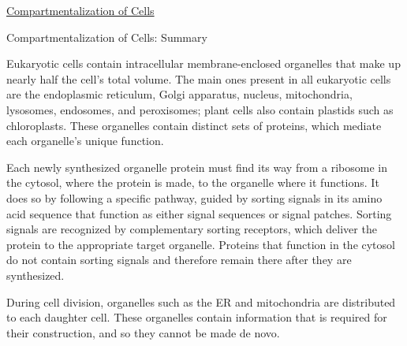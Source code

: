 \documentclass[12pt,letterpaper]{article}
\begin{document}
\begin{secbox}{\hyperlink{12}{Compartmentalization of Cells}}
{    \begin{probbox}{Compartmentalization of Cells: Summary}\end{probbox}
        Eukaryotic cells contain intracellular membrane-enclosed organelles that make up nearly half the cell’s total volume. The main ones present in all eukaryotic cells are the endoplasmic reticulum, Golgi apparatus, nucleus, mitochondria, lysosomes, endosomes, and peroxisomes; plant cells also contain plastids such as chloroplasts. These organelles contain distinct sets of proteins, which mediate each organelle’s unique function.\par 
        \vspace{10 pt}
        Each newly synthesized organelle protein must find its way from a ribosome in the cytosol, where the protein is made, to the organelle where it functions. It does so by following a specific pathway, guided by sorting signals in its amino acid sequence that function as either signal sequences or signal patches. Sorting signals are recognized by complementary sorting receptors, which deliver the protein to the appropriate target organelle. Proteins that function in the cytosol do not contain sorting signals and therefore remain there after they are synthesized.\par
        \vspace{10pt}
        During cell division, organelles such as the ER and mitochondria are distributed to each daughter cell. These organelles contain information that is required for their construction, and so they cannot be made de novo.
}\end{secbox}
\end{document}
